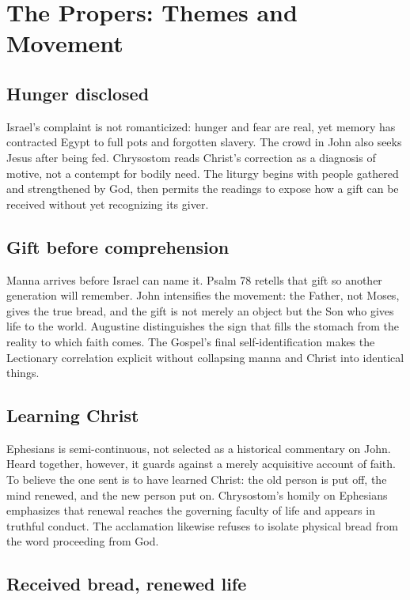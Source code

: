 \label{triptych:brief-synthesis:start}
\section*{The Propers: Themes and Movement}

\subsection*{Hunger disclosed}

Israel's complaint is not romanticized: hunger and fear are real, yet memory
has contracted Egypt to full pots and forgotten slavery. The crowd in John
also seeks Jesus after being fed. Chrysostom reads Christ's correction as a
diagnosis of motive, not a contempt for bodily need. The liturgy begins with
people gathered and strengthened by God, then permits the readings to expose
how a gift can be received without yet recognizing its giver.

\subsection*{Gift before comprehension}

Manna arrives before Israel can name it. Psalm 78 retells that gift so another
generation will remember. John intensifies the movement: the Father, not
Moses, gives the true bread, and the gift is not merely an object but the Son
who gives life to the world. Augustine distinguishes the sign that fills the
stomach from the reality to which faith comes. The Gospel's final
self-identification makes the Lectionary correlation explicit without
collapsing manna and Christ into identical things.

\subsection*{Learning Christ}

Ephesians is semi-continuous, not selected as a historical commentary on
John. Heard together, however, it guards against a merely acquisitive account
of faith. To believe the one sent is to have learned Christ: the old person is
put off, the mind renewed, and the new person put on. Chrysostom's homily on
Ephesians emphasizes that renewal reaches the governing faculty of life and
appears in truthful conduct. The acclamation likewise refuses to isolate
physical bread from the word proceeding from God.

\subsection*{Received bread, renewed life}

